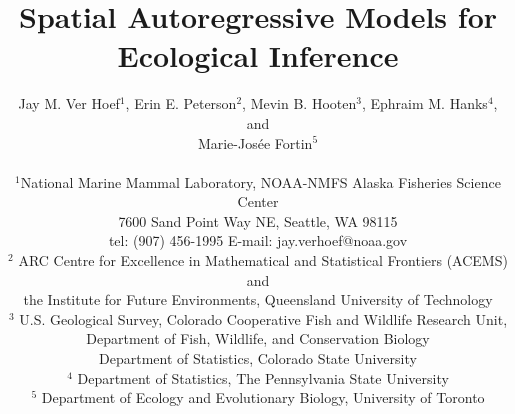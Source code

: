 \documentclass[11pt, titlepage]{article}\usepackage[]{graphicx}\usepackage[]{color}
\begin{document}

\titlepage
\title {Spatial Autoregressive Models for Ecological Inference}
\author{Jay M. Ver Hoef$^1$, Erin E. Peterson$^2$, Mevin B. Hooten$^3$, Ephraim M. Hanks$^4$, and \\
	Marie-Jos\'{e}e Fortin$^5$ \\
\hrulefill \\ 
$^1$National Marine Mammal Laboratory, NOAA-NMFS Alaska Fisheries Science Center\\
7600 Sand Point Way NE, Seattle, WA 98115\\
tel: (907) 456-1995 \hspace{.5cm} E-mail: jay.verhoef@noaa.gov\\
$^2$ ARC Centre for Excellence in Mathematical and Statistical Frontiers (ACEMS) and \\
the Institute for Future Environments, Queensland University of Technology \\ 
$^3$ U.S. Geological Survey, Colorado Cooperative Fish and Wildlife Research Unit, \\
Department of Fish, Wildlife, and Conservation Biology \\
Department of Statistics, Colorado State University \\
$^4$ Department of Statistics, The Pennsylvania State University \\
$^5$ Department of Ecology and Evolutionary Biology, University of Toronto \\
\hrulefill \\
}

\maketitle

\end{document}
